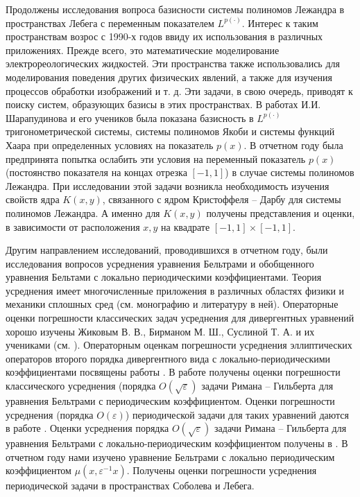 Продолжены исследования вопроса базисности системы полиномов Лежандра в пространствах Лебега с переменным показателем $L^{p(\cdot)}$. Интерес к таким пространствам возрос с 1990-х годов ввиду их использования в различных приложениях. Прежде всего, это математические
моделирование электрореологических жидкостей. Эти пространства также использовались для моделирования поведения других физических явлений, а также для изучения процессов обработки изображений и т. д. Эти задачи, в свою очередь, приводят к поиску систем, образующих базисы в этих пространствах. В работах И.И. Шарапудинова и его учеников \cite{tad-SHII-Haar,tad-SHII-AnalisysMath,tad-SHII-Leg,tad-MMG-Haar,tad-SHII-Jacob,tad-SHII-Ult,tad-RAM-Jacob} была показана базисность в $L^{p(\cdot)}$  тригонометрической системы, системы полиномов Якоби и системы функций Хаара при определенных условиях на показатель $p(x)$.
В отчетном году была предпринята попытка ослабить эти условия на переменный показатель $p(x)$ (постоянство показателя на концах отрезка $[-1,1]$) в случае системы полиномов Лежандра. При исследовании этой задачи возникла необходимость изучения свойств ядра $K(x,y)$, связанного с ядром Кристоффеля -- Дарбу для системы полиномов Лежандра. А именно для $K(x,y)$ получены  представления и оценки, в зависимости от расположения $x,y$ на квадрате $[-1,1]\times[-1,1]$.

Другим направлением исследований, проводившихся в отчетном году, были исследования вопросов усреднения уравнения Бельтрами и обобщенного уравнения Бельтами с локально периодическими коэффициентами. Теория усреднения имеет многочисленные приложения в различных областях физики и механики сплошных сред (см. монографию \cite{smm-1} и литературу в  ней). Операторные оценки погрешности классических задач усреднения для дивергентных уравнений хорошо изучены Жиковым В. В., Бирманом   М. Ш., Суслиной  Т. А. и их учениками (см. \cite{smm-2,smm-3}).
Операторным оценкам погрешности усреднения  эллиптических операторов второго порядка дивергентного вида  с локально-периодическими коэффициентами посвящены работы \cite{smm-4,smm-5,smm-6,smm-7}.
В работе \cite{smm-8} получены оценки погрешности классического усреднения (порядка  $O(\sqrt\varepsilon)$ задачи Римана -- Гильберта  для уравнения Бельтрами с периодическим коэффициентом. Оценки погрешности усреднения (порядка $O(\varepsilon)$) периодической задачи для таких уравнений даются в работе \cite{smm-9}.  Оценки усреднения  порядка $O(\sqrt\varepsilon)$  задачи Римана -- Гильберта для уравнения Бельтрами с локально-периодическим коэффициентом получены  в \cite{smm-10}. В отчетном году нами изучено уравнение Бельтрами с локально периодическим коэффициентом $\mu(x,\varepsilon^{-1} x)$. Получены оценки
погрешности усреднения периодической задачи в пространствах Соболева и Лебега.


